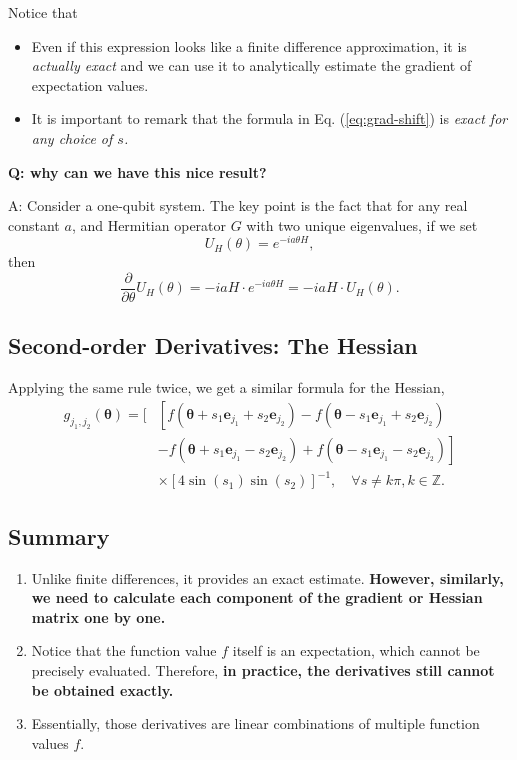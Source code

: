 \documentclass[
        11pt, %
	a4paper, %
]{LegrandOrangeBook}
\begin{document}
Notice that 
\begin{itemize}
    \item Even if this expression looks like a finite difference approximation, it is \textit{actually exact} and we can use it to analytically estimate the gradient of expectation values.
    \item It is important to remark that the formula in Eq. (\ref{eq:grad-shift}) is \textit{exact for any choice of $s$. }
\end{itemize}

\textbf{Q: why can we have this nice result?} 

A: Consider a one-qubit system. The key point is the fact that for any real constant $a$, and Hermitian operator $G$ with two unique eigenvalues, if we set
\begin{equation}
    U_H(\theta)=e^{-i a \theta H},
\end{equation}
then
\begin{equation}
    \frac{\partial}{\partial \theta} U_H(\theta)=-i a H \cdot e^{-i a \theta H} = -i a H \cdot U_H(\theta) .
\end{equation}

\subsection{Second-order Derivatives: The Hessian}
Applying the same rule twice, we get a similar formula for the Hessian,
\begin{equation}
\begin{aligned}
g_{j_1, j_2}(\boldsymbol{\theta})=[ & {\left[f\left(\boldsymbol{\theta}+s_1 \mathbf{e}_{j_1}+s_2 \mathbf{e}_{j_2}\right)-f\left(\boldsymbol{\theta}-s_1 \mathbf{e}_{j_1}+s_2 \mathbf{e}_{j_2}\right)\right.} \\
& \left.-f\left(\boldsymbol{\theta}+s_1 \mathbf{e}_{j_1}-s_2 \mathbf{e}_{j_2}\right)+f\left(\boldsymbol{\theta}-s_1 \mathbf{e}_{j_1}-s_2 \mathbf{e}_{j_2}\right)\right] \\
& \times\left[4 \sin \left(s_1\right) \sin \left(s_2\right)\right]^{-1}, \quad \forall s \neq k \pi, k \in \mathbb{Z}.
\end{aligned}
\end{equation}

\subsection{Summary}

\begin{enumerate}
    \item Unlike finite differences, it provides an exact estimate. \textbf{However, similarly, we need to calculate each component of the gradient or Hessian matrix one by one.}
    \item Notice that the function value $f$ itself is an expectation, which cannot be precisely evaluated. Therefore, \textbf{in practice, the derivatives still cannot be obtained exactly.}
    \item Essentially, those derivatives are linear combinations of multiple function values $f$.
\end{enumerate}
\end{document}
